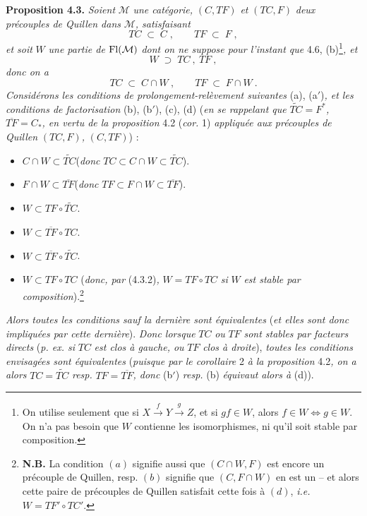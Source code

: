 \textbf{Proposition 4.3.} \textit{Soient} $\mathcal{M}$ \textit{une catégorie,} $(C,TF)$ \textit{et} $(TC,F)$ \textit{deux précouples de Quillen dans} $\mathcal{M}$\textit{, satisfaisant}
\[
TC \;\subset\; C\;, \qquad TF \;\subset\; F\;,
\tag*{(4.3.1)}
\]
\textit{et soit} $W$ \textit{une partie de} $\mathrm{Fl}(\mathcal{M})$ \textit{dont on ne suppose pour l'instant que} 4.6, (b)\footnote[10]{On utilise seulement que si $X\xrightarrow{\;f\;}Y\xrightarrow{\;g\;}Z$, et si $gf\in W$, alors $f\in W\Longleftrightarrow g\in W$. On n'a pas besoin que $W$ contienne les isomorphismes, ni qu'il soit stable par composition.}\textit{, et} %
\[
W \;\supset\; TC\ ,\ TF\ ,
\tag*{(4.3.2)}
\]
\textit{donc on a}
\[
TC \;\subset\; C\cap W\ , \qquad TF \;\subset\; F\cap W\ .
\tag*{(4.3.3)}
\]
\textit{Considérons les conditions de prolongement-relèvement suivantes} (a), (a$'$)\textit{, et les conditions de factorisation} (b), (b$'$), (c), (d) (\textit{en se rappelant que} $\widetilde{TC}=F^*$\textit{,} $\overline{TF}=C_*$\textit{, en vertu de la proposition} 4.2 (\textit{cor.} 1) \textit{appliquée aux précouples de Quillen} $(TC,F)$\textit{,} $(C,TF)$) :
\begin{itemize}[leftmargin=2.5em]
\item[a)] $C\cap W\subset\widetilde{TC}$\quad (\textit{donc} $TC\subset C\cap W\subset\widetilde{TC}$).
\item[a$'$)] $F\cap W\subset\overline{TF}$\quad (\textit{donc} $TF\subset F\cap W\subset\overline{TF}$).
\item[b)] $W\subset TF\circ\widetilde{TC}$.
\item[b$'$)] $W\subset\overline{TF}\circ TC$.
\item[c)] $W\subset\overline{TF}\circ\widetilde{TC}$.
\item[d)] $W\subset TF{\circ}TC$ (\textit{donc, par} (4.3.2)\textit{,} $W=TF{\circ}TC$ \textit{si} $W$ \textit{est stable par composition}).\footnote[11]{\textbf{N.B.} La condition $(a)$ signifie aussi que $(C\cap W,F)$ est encore un précouple de Quillen, resp. $(b)$ signifie que $(C,F\cap W)$ en est un -- et alors cette paire de précouples de Quillen satisfait cette fois à $(d)$, \textit{i.e.} $W=TF'\circ TC'$.} %
\end{itemize}

\textit{Alors toutes les conditions sauf la dernière sont équivalentes} (\textit{et elles sont donc impliquées par cette dernière}). \textit{Donc lorsque} $TC$ \textit{ou} $TF$ \textit{sont stables par facteurs directs} (\textit{p. ex. si} $TC$ \textit{est clos à gauche, ou} $TF$ \textit{clos à droite}), \textit{toutes les conditions envisagées sont équivalentes} (\textit{puisque par le corollaire} 2 \textit{à la proposition} 4.2\textit{, on a alors} $TC=\widetilde{TC}$ \textit{resp.} $TF=\overline{TF}$\textit{, donc} (b$'$) \textit{resp.} (b) \textit{équivaut alors à} (d)).

